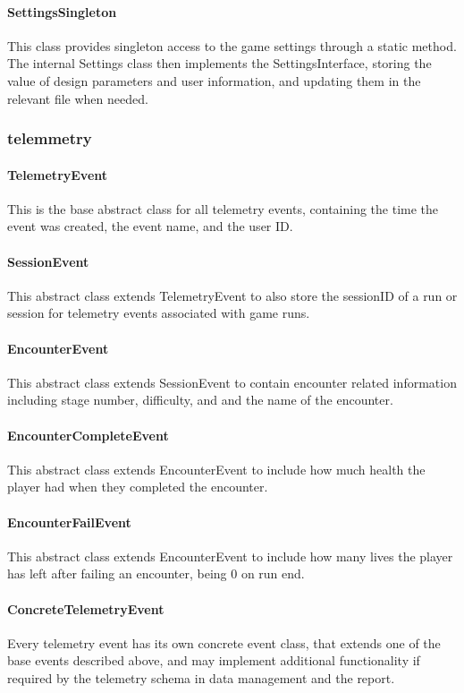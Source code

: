 \documentclass[11pt]{article}
\begin{document}
\paragraph{SettingsSingleton}
This class provides singleton access to the game settings through a static method. The internal Settings class then implements the SettingsInterface, storing the value of design parameters and user information, and updating them in the relevant file when needed.

\subsubsection{telemmetry}

\paragraph{TelemetryEvent}
This is the base abstract class for all telemetry events, containing the time the event was created, the event name, and the user ID.

\paragraph{SessionEvent}
This abstract class extends TelemetryEvent to also store the sessionID of a run or session for telemetry events associated with game runs. 

\paragraph{EncounterEvent}
This abstract class extends SessionEvent to contain encounter related information including stage number, difficulty, and and the name of the encounter.

\paragraph{EncounterCompleteEvent}
This abstract class extends EncounterEvent to include how much health the player had when they completed the encounter. 

\paragraph{EncounterFailEvent}
This abstract class extends EncounterEvent to include how many lives the player has left after failing an encounter, being 0 on run end.

\paragraph{ConcreteTelemetryEvent}
Every telemetry event has its own concrete event class, that extends one of the base events described above, and may implement additional functionality if required by the telemetry schema in data management and the report. 
\end{document}
